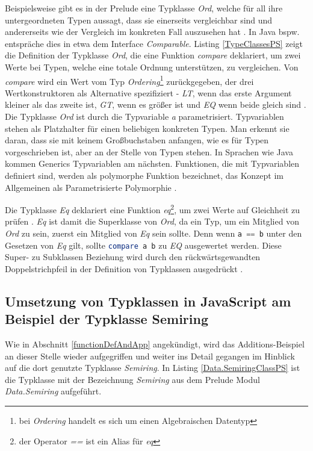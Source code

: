 \documentclass[
12pt,
ngerman,
oneside]
{scrbook} %
\begin{document}
Beispielsweise gibt es in der Prelude eine Typklasse \emph{Ord}, welche für all ihre untergeordneten Typen aussagt, dass sie einerseits vergleichbar sind und andererseits wie der Vergleich im konkreten Fall auszusehen hat \cite[][S. 65]{Freeman17}. In Java bspw. entspräche dies in etwa dem Interface \emph{Comparable}. Listing \ref{TypeClassesPS} zeigt die Definition der Typklasse \emph{Ord}, die eine Funktion \emph{compare} deklariert, um zwei Werte bei Typen, welche eine totale Ordnung unterstützen, zu vergleichen.  Von \emph{compare} wird ein Wert vom Typ \emph{Ordering}\footnote{bei \emph{Ordering} handelt es sich um einen Algebraischen Datentyp} zurückgegeben, der drei Wertkonstruktoren als Alternative spezifiziert - \emph{LT}, wenn das erste Argument kleiner als das zweite ist, \emph{GT}, wenn es größer ist und \emph{EQ} wenn beide gleich sind \cite[][S. 66]{Freeman17}. Die Typklasse  \emph{Ord} ist durch die Typvariable \emph{a} parametrisiert. Typvariablen stehen als Platzhalter für einen beliebigen konkreten Typen. Man erkennt sie daran, dass sie mit keinem Großbuchstaben anfangen, wie es für Typen vorgeschrieben ist, aber an der Stelle von Typen stehen. In Sprachen wie Java kommen Generics Typvariablen am nächsten. Funktionen, die mit Typvariablen definiert sind, werden als polymorphe Funktion bezeichnet, das Konzept im Allgemeinen als Parametrisierte Polymorphie \cite[Kap. Types and Typeclasses, Abschn. Typevariables]{Haskell11}.

Die Typklasse \emph{Eq} deklariert eine Funktion \emph{eq}\footnote{der Operator \emph{==} ist ein Alias für \emph{eq}}, um zwei Werte auf Gleichheit zu prüfen \cite[][S. 65]{Freeman17}. \emph{Eq} ist damit die Superklasse von \emph{Ord}, da ein Typ, um ein Mitglied von \emph{Ord} zu sein, zuerst ein Mitglied von \emph{Eq} sein sollte. Denn wenn \glqq\lstinline[language=purescript, columns=fixed]{a == b}\grqq{} unter den Gesetzen von \emph{Eq} gilt, sollte \glqq\lstinline[language=purescript, columns=fixed]{compare a b}\grqq{} zu \emph{EQ} ausgewertet werden. Diese Super- zu Subklassen Beziehung wird durch den rückwärtsgewandten Doppelstrichpfeil in der Definition von Typklassen ausgedrückt \cite[][S. 77]{Freeman17}.

\subsection{Umsetzung von Typklassen in JavaScript am Beispiel der Typklasse Semiring}
\label{SemiringUmsetzung}
Wie in Abschnitt \glqq \ref{functionDefAndApp} \grqq{} angekündigt, wird das Additions-Beispiel an dieser Stelle wieder aufgegriffen und weiter ins Detail gegangen im Hinblick auf die dort genutzte Typklasse \emph{Semiring}. In Listing \ref{Data.SemiringClassPS} ist die Typklasse mit der Bezeichnung \emph{Semiring} aus dem Prelude Modul \emph{Data.Semiring} aufgeführt.
\end{document}
